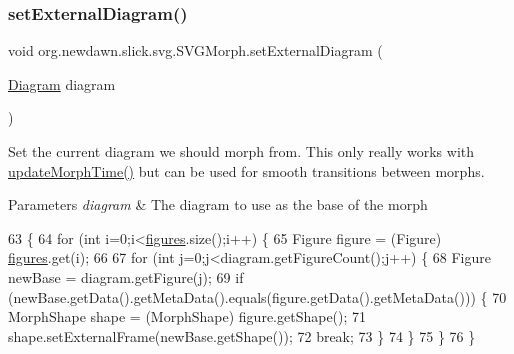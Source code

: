 \subsubsection{\texorpdfstring{set\+External\+Diagram()}{setExternalDiagram()}}
{\footnotesize\ttfamily void org.\+newdawn.\+slick.\+svg.\+S\+V\+G\+Morph.\+set\+External\+Diagram (\begin{DoxyParamCaption}\item[{\mbox{\hyperlink{classorg_1_1newdawn_1_1slick_1_1svg_1_1_diagram}{Diagram}}}]{diagram }\end{DoxyParamCaption})\hspace{0.3cm}{\ttfamily [inline]}}

Set the current diagram we should morph from. This only really works with \mbox{\hyperlink{classorg_1_1newdawn_1_1slick_1_1svg_1_1_s_v_g_morph_afba9cd5655c85ee202a36f57afdbb86d}{update\+Morph\+Time()}} but can be used for smooth transitions between morphs.


\begin{DoxyParams}{Parameters}
{\em diagram} & The diagram to use as the base of the morph \\
\hline
\end{DoxyParams}

\begin{DoxyCode}
63                                                     \{
64         \textcolor{keywordflow}{for} (\textcolor{keywordtype}{int} i=0;i<\mbox{\hyperlink{classorg_1_1newdawn_1_1slick_1_1svg_1_1_s_v_g_morph_ab3f69a342347ec5d6fa4c65aa6671e4b}{figures}}.size();i++) \{
65             Figure figure = (Figure) \mbox{\hyperlink{classorg_1_1newdawn_1_1slick_1_1svg_1_1_s_v_g_morph_ab3f69a342347ec5d6fa4c65aa6671e4b}{figures}}.get(i);
66             
67             \textcolor{keywordflow}{for} (\textcolor{keywordtype}{int} j=0;j<diagram.getFigureCount();j++) \{
68                 Figure newBase = diagram.getFigure(j);
69                 \textcolor{keywordflow}{if} (newBase.getData().getMetaData().equals(figure.getData().getMetaData())) \{
70                     MorphShape shape = (MorphShape) figure.getShape();
71                     shape.setExternalFrame(newBase.getShape());
72                     \textcolor{keywordflow}{break};
73                 \}
74             \}
75         \}
76     \}
\end{DoxyCode}
\mbox{\label{classorg_1_1newdawn_1_1slick_1_1svg_1_1_s_v_g_morph_a2c74a6faaa71fd64eaee5a0848f29423}} 
